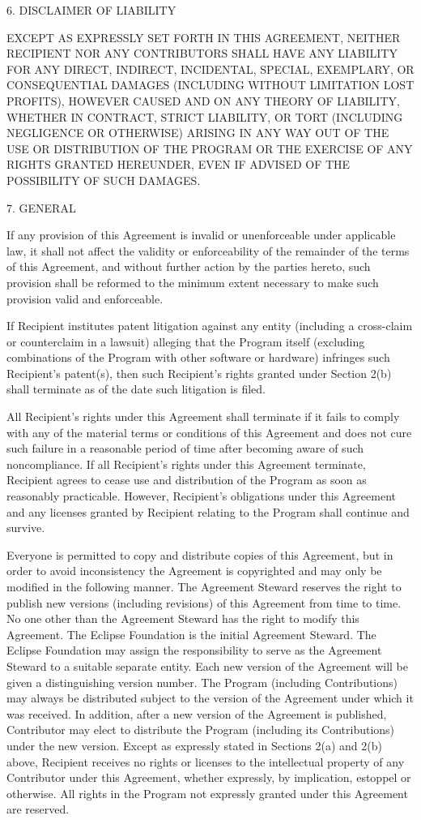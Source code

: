 \documentclass[10pt,letterpaper,titlepage]{article}
\begin{document}
6. DISCLAIMER OF LIABILITY

EXCEPT AS EXPRESSLY SET FORTH IN THIS AGREEMENT, NEITHER RECIPIENT NOR ANY CONTRIBUTORS SHALL HAVE ANY LIABILITY FOR ANY DIRECT, INDIRECT, INCIDENTAL, SPECIAL, EXEMPLARY, OR CONSEQUENTIAL DAMAGES (INCLUDING WITHOUT LIMITATION LOST PROFITS), HOWEVER CAUSED AND ON ANY THEORY OF LIABILITY, WHETHER IN CONTRACT, STRICT LIABILITY, OR TORT (INCLUDING NEGLIGENCE OR OTHERWISE) ARISING IN ANY WAY OUT OF THE USE OR DISTRIBUTION OF THE PROGRAM OR THE EXERCISE OF ANY RIGHTS GRANTED HEREUNDER, EVEN IF ADVISED OF THE POSSIBILITY OF SUCH DAMAGES.

7. GENERAL

If any provision of this Agreement is invalid or unenforceable under applicable law, it shall not affect the validity or enforceability of the remainder of the terms of this Agreement, and without further action by the parties hereto, such provision shall be reformed to the minimum extent necessary to make such provision valid and enforceable.

If Recipient institutes patent litigation against any entity (including a cross-claim or counterclaim in a lawsuit) alleging that the Program itself (excluding combinations of the Program with other software or hardware) infringes such Recipient's patent(s), then such Recipient's rights granted under Section 2(b) shall terminate as of the date such litigation is filed.

All Recipient's rights under this Agreement shall terminate if it fails to comply with any of the material terms or conditions of this Agreement and does not cure such failure in a reasonable period of time after becoming aware of such noncompliance. If all Recipient's rights under this Agreement terminate, Recipient agrees to cease use and distribution of the Program as soon as reasonably practicable. However, Recipient's obligations under this Agreement and any licenses granted by Recipient relating to the Program shall continue and survive.

Everyone is permitted to copy and distribute copies of this Agreement, but in order to avoid inconsistency the Agreement is copyrighted and may only be modified in the following manner. The Agreement Steward reserves the right to publish new versions (including revisions) of this Agreement from time to time. No one other than the Agreement Steward has the right to modify this Agreement. The Eclipse Foundation is the initial Agreement Steward. The Eclipse Foundation may assign the responsibility to serve as the Agreement Steward to a suitable separate entity. Each new version of the Agreement will be given a distinguishing version number. The Program (including Contributions) may always be distributed subject to the version of the Agreement under which it was received. In addition, after a new version of the Agreement is published, Contributor may elect to distribute the Program (including its Contributions) under the new version. Except as expressly stated in Sections 2(a) and 2(b) above, Recipient receives no rights or licenses to the intellectual property of any Contributor under this Agreement, whether expressly, by implication, estoppel or otherwise. All rights in the Program not expressly granted under this Agreement are reserved.
\end{document}
